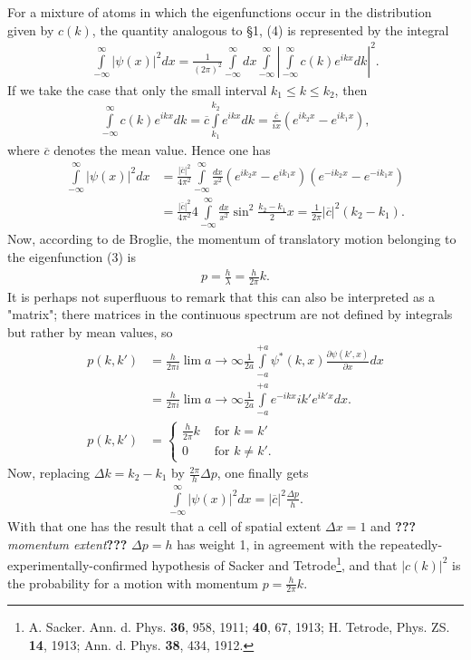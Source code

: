 \documentclass[a4paper,11pt]{article}
\newcommand{\textbb}[1]{\textbf{#1}}
\newcommand{\WTF}[1]{\textbf{???}\textit{#1}\textbf{???}}
\newcommand{\?}[2]{#1\footnote{\textsc{Translator note}: #2}}
\newcommand{\nequ}[2]{\begin{align*}\tag{#1}#2\end{align*}}
\newcommand{\uequ}[1]{\begin{align*}#1\end{align*}}
\renewcommand{\exp}[1]{e^{#1}}
\begin{document}
For a mixture of atoms in which the eigenfunctions occur in the distribution given by $c(k)$, the quantity analogous to \S 1, (4) is represented by the integral
\nequ{6}{
\int\limits_{-\infty}^{\infty}\left|\psi(x)\right|^2 dx = 
\frac{1}{(2\pi)^2} \int\limits_{-\infty}^{\infty}dx \int\limits_{-\infty}^{\infty}\left| \int\limits_{-\infty}^{\infty}c(k)\exp{ikx}dk\right|^2.
}
If we take the case that only the small interval $k_1 \leq k \leq k_2$, then
\uequ{
\int\limits_{-\infty}^{\infty} c(k)\exp{ikx}dk = \overline{c}\int\limits_{k_1}^{k_2} \exp{ikx} dk = \frac{\overline{c}}{ix}(\exp{ik_2 x} - \exp{ik_1 x}),
}
where $\overline{c}$ denotes the mean value. Hence one has
\uequ{
\int\limits_{-\infty}^{\infty}|\psi(x)|^2 dx &= 
\frac{|\overline{c}|^2}{4\pi^2} \int\limits_{-\infty}^{\infty} \frac{dx}{x^2}(\exp{ik_2 x} - \exp{ik_1 x})(\exp{-ik_2 x} - \exp{-ik_1 x})\\
&= \frac{|\overline{c}|^2}{4\pi^2} 4 \int\limits_{-\infty}^{\infty} \frac{dx}{x^2}
\sin^2\frac{k_2-k_1}{2}x = \frac{1}{2\pi}|\overline{c}|^2(k_2 - k_1).
}
Now, according to de Broglie, the momentum of translatory motion belonging to the eigenfunction (3) is
\nequ{7}{p = \frac{h}{\lambda} = \frac{h}{2\pi}k.}
It is perhaps not superfluous to remark that this can also be interpreted as a "matrix"; there matrices in the continuous spectrum are not defined by integrals but rather by mean values, so
\nequ{8}{
p(k,k') &= \frac{h}{2\pi i}\lim{a\to\infty}\frac{1}{2a}\int\limits_{-a}^{+a}\psi^*(k,x)\frac{\partial\psi(k',x)}{\partial x}dx\\
&= \frac{h}{2\pi i}\lim{a\to\infty}\frac{1}{2a}\int\limits_{-a}^{+a}\exp{-ikx}ik'\exp{ik'x}dx.\\
p(k,k') &= \begin{cases}
 \frac{h}{2\pi} k & \text{ for } k=k'\\
 0 & \text{ for } k \neq k'.
 \end{cases}
}
Now, replacing $\Delta k = k_2 - k_1$ by $\frac{2\pi}{h}\Delta p$, one finally gets
\nequ{9}{
\int\limits_{-\infty}^{\infty}\left|\psi(x)\right|^2 dx = |\overline{c}|^2\frac{\Delta p}{h}.
}
With that one has the result that a cell of spatial extent $\Delta x=1$ and \WTF{momentum extent} $\Delta p = h$ has weight 1, in agreement with the repeatedly-experimentally-confirmed hypothesis of Sacker and Tetrode\footnote{A. Sacker. Ann. d. Phys. \textbb{36}, 958, 1911; \textbb{40}, 67, 1913; H. Tetrode, Phys. ZS. \textbb{14}, 1913; Ann. d. Phys. \textbb{38}, 434, 1912.}, and that  $|c(k)|^2$ is the probability for a motion with momentum $p=\frac{h}{2\pi}k$.
\end{document}
